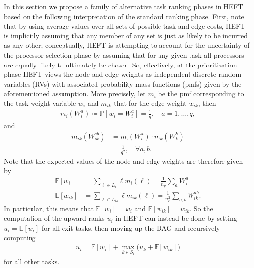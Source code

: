 \documentclass[12pt]{article}
\def\P{\mathbb{P}}
\def\E{\mathbb{E}}
\begin{document}
In this section we propose a family of alternative task ranking phases in HEFT based on the following interpretation of the standard ranking phase. First, note that by using average values over all sets of possible task and edge costs, HEFT is implicitly assuming that any member of any set is just as likely to be incurred as any other; conceptually, HEFT is attempting to account for the uncertainty of the processor selection phase by assuming that for any given task all processors are equally likely to ultimately be chosen. So, effectively, at the prioritization phase HEFT views the node and edge weights as independent discrete random variables (RVs) with associated probability mass functions (pmfs) given by the aforementioned assumption. More precisely, let $m_i$ be the pmf corresponding to the task weight variable $w_i$ and $m_{ik}$ that for the edge weight $w_{ik}$, then  
\begin{align*}
m_i(W_i^a) \coloneqq \P[w_i = W_i^a] = \frac{1}{q}, \quad a = 1, \dots, q,
\end{align*}
and   
\begin{align*}
m_{ik}(W_{ik}^{ab}) &= m_i(W_i^a) \cdot m_k(W_k^b) \\
&= \frac{1}{q^2}, \quad \forall a, b.
\end{align*}
Note that the expected values of the node and edge weights are therefore given by
\begin{align}
\E[w_i] &= \sum_{\ell \in L_i} \ell m_i(\ell) = \frac{1}{n_p} \sum_{a} W_i^a \label{eq.expected_node}\\
\E[w_{ik}] &= \sum_{\ell \in L_{ik}} \ell m_{ik}(\ell) = \frac{1}{n_p^2} \sum_{a, b} W_{ik}^{ab} \label{eq.expected_edge}.
\end{align}
In particular, this means that $\E[w_i] = \overline{w_i}$ and $\E[w_{ik}] = \overline{w_{ik}}$. So the computation of the upward ranks $u_i$ in HEFT can instead be done by setting $u_i = \E[w_i]$ for all exit tasks, then moving up the DAG and recursively computing
\begin{align}
u_i = \E[w_i] + \max_{k \in S_i} \big( u_k + \E[w_{ik}] \big) \label{eq.ur_expectation}
\end{align}
for all other tasks.
\end{document}
